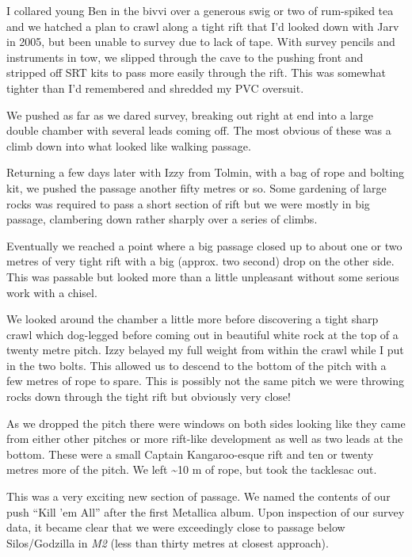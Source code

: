 I collared young Ben in the bivvi over a generous swig or two of
rum-spiked tea and we hatched a plan to crawl along a tight rift that
I'd looked down with Jarv in 2005, but been unable to survey due to lack
of tape. With survey pencils and instruments in tow, we slipped through
the cave to the pushing front and stripped off SRT kits to pass more
easily through the rift. This was somewhat tighter than I'd remembered
and shredded my PVC oversuit.

We pushed as far as we dared survey, breaking out right at end into a
large double chamber with several leads coming off. The most obvious of
these was a climb down into what looked like walking passage.

Returning a few days later with Izzy from Tolmin, with a bag of rope and
bolting kit, we pushed the passage another fifty metres or so. Some
gardening of large rocks was required to pass a short section of rift
but we were mostly in big passage, clambering down rather sharply over a
series of climbs.

Eventually we reached a point where a big passage closed up to about one
or two metres of very tight rift with a big (approx. two second) drop on
the other side. This was passable but looked more than a little
unpleasant without some serious work with a chisel.

We looked around the chamber a little more before discovering a tight
sharp crawl which dog-legged before coming out in beautiful white rock
at the top of a twenty metre pitch. Izzy belayed my full weight from
within the crawl while I put in the two bolts. This allowed us to
descend to the bottom of the pitch with a few metres of rope to spare.
This is possibly not the same pitch we were throwing rocks down through
the tight rift but obviously very close!

As we dropped the pitch there were windows on both sides looking like
they came from either other pitches or more rift-like development as
well as two leads at the bottom. These were a small Captain
Kangaroo-esque rift and ten or twenty metres more of the pitch. We left
\textasciitilde{}10 m of rope, but took the tacklesac out.

This was a very exciting new section of passage. We named the contents
of our push ``Kill 'em All'' after the first Metallica album. Upon
inspection of our survey data, it became clear that we were exceedingly
close to passage below Silos/Godzilla in \emph{M2} (less than thirty
metres at closest approach).

